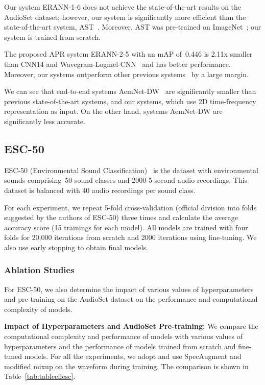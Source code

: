 \documentclass{article}
\begin{document}
\begin{sloppy}
\begin{table}[th]
\end{table}

Our system \mbox{ERANN-1-6} does not achieve the state-of-the-art results on the AudioSet dataset; however, our system is significantly more efficient than the state-of-the-art system, AST~\cite{gong21b_interspeech}. Moreover, AST was pre-trained on ImageNet~\cite{5206848}; our system is trained from scratch. 

The proposed APR system \mbox{ERANN-2-5} with an mAP of~0.446 is 2.11x smaller than CNN14 and Wavegram-Logmel-CNN~\cite{9229505} and has better performance. Moreover, our systems outperform other previous systems~\cite{Guzhov2021ESResNeXtfbspLR, 9414229} by a large margin.

We can see that end-to-end systems AemNet-DW~\cite{9414229} are significantly smaller than previous state-of-the-art systems, and our systems, which use 2D time-frequency representation as input. On the other hand, systems AemNet-DW are significantly less accurate.



\subsection{ESC-50}
\setlength{\parindent}{3.0ex}
ESC-50 (Environmental Sound Classification)~\cite{10.1145/2733373.2806390} is the dataset with environmental sounds comprising~50 sound classes and 2000 \mbox{5-second} audio recordings. This dataset is balanced with 40 audio recordings per sound class.

For each experiment, we repeat 5-fold cross-validation (official division into folds suggested by the authors of ESC-50) three times and calculate the average accuracy score (15 trainings for each model). All models are trained with four folds for 20,000 iterations from scratch and 2000 iterations using fine-tuning. We also use early stopping to obtain final models.

\subsubsection{Ablation Studies}
For ESC-50, we also determine the impact of various values of hyperparameters and pre-training on the AudioSet dataset on the performance and computational complexity of models.

\vspace{3mm}

\noindent\textbf{Impact of Hyperparameters and AudioSet Pre-training:} We compare the computational complexity and performance of models with various values of hyperparameters and the performance of models trained from scratch and fine-tuned models. For all the experiments, we adopt  and use SpecAugment and modified mixup on the waveform during training. The comparison is shown in Table~\ref{tab:tableeffesc}.


\end{sloppy}
\end{document}

